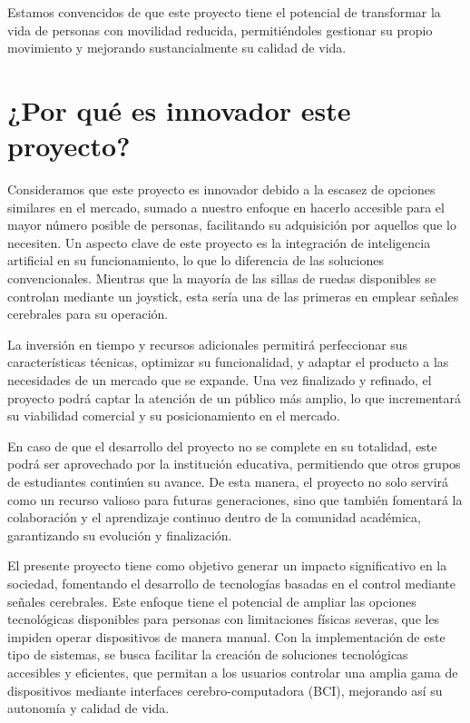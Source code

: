 \documentclass{article}
\begin{document}
Estamos convencidos de que este proyecto tiene el potencial de transformar la vida de personas con movilidad reducida, permitiéndoles gestionar su propio movimiento y mejorando sustancialmente su calidad de vida.

\section{¿Por qué es innovador este proyecto?}

Consideramos que este proyecto es innovador debido a la escasez de opciones similares en el mercado, sumado a nuestro enfoque en hacerlo accesible para el mayor número posible de personas, facilitando su adquisición por aquellos que lo necesiten. Un aspecto clave de este proyecto es la integración de inteligencia artificial en su funcionamiento, lo que lo diferencia de las soluciones convencionales. Mientras que la mayoría de las sillas de ruedas disponibles se controlan mediante un joystick, esta sería una de las primeras en emplear señales cerebrales para su operación.

La inversión en tiempo y recursos adicionales permitirá perfeccionar sus características técnicas, optimizar su funcionalidad, y adaptar el producto a las necesidades de un mercado que se expande. Una vez finalizado y refinado, el proyecto podrá captar la atención de un público más amplio, lo que incrementará su viabilidad comercial y su posicionamiento en el mercado.

En caso de que el desarrollo del proyecto no se complete en su totalidad, este podrá ser aprovechado por la institución educativa, permitiendo que otros grupos de estudiantes continúen su avance. De esta manera, el proyecto no solo servirá como un recurso valioso para futuras generaciones, sino que también fomentará la colaboración y el aprendizaje continuo dentro de la comunidad académica, garantizando su evolución y finalización.

El presente proyecto tiene como objetivo generar un impacto significativo en la sociedad, fomentando el desarrollo de tecnologías basadas en el control mediante señales cerebrales. Este enfoque tiene el potencial de ampliar las opciones tecnológicas disponibles para personas con limitaciones físicas severas, que les impiden operar dispositivos de manera manual. Con la implementación de este tipo de sistemas, se busca facilitar la creación de soluciones tecnológicas accesibles y eficientes, que permitan a los usuarios controlar una amplia gama de dispositivos mediante interfaces cerebro-computadora (BCI), mejorando así su autonomía y calidad de vida.
\end{document}
